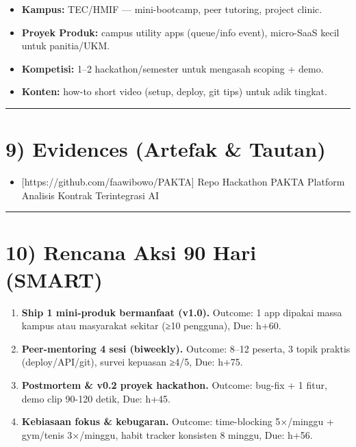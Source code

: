 \documentclass[
  letterpaper,
  DIV=11,
  numbers=noendperiod]{scrreprt}
\providecommand{\tightlist}{%
  \setlength{\itemsep}{0pt}\setlength{\parskip}{0pt}}
\begin{document}
\begin{itemize}
\tightlist
\item
  \textbf{Kampus:} TEC/HMIF --- mini-bootcamp, peer tutoring, project
  clinic.
\item
  \textbf{Proyek Produk:} campus utility apps (queue/info event),
  micro-SaaS kecil untuk panitia/UKM.
\item
  \textbf{Kompetisi:} 1--2 hackathon/semester untuk mengasah scoping +
  demo.
\item
  \textbf{Konten:} how-to short video (setup, deploy, git tips) untuk
  adik tingkat.
\end{itemize}

\begin{center}\rule{0.5\linewidth}{0.5pt}\end{center}

\section{9) Evidences (Artefak \&
Tautan)}\label{evidences-artefak-tautan}

\begin{itemize}
\tightlist
\item
  {[}https://github.com/faawibowo/PAKTA{]} Repo Hackathon PAKTA Platform
  Analisis Kontrak Terintegrasi AI
\end{itemize}

\begin{center}\rule{0.5\linewidth}{0.5pt}\end{center}

\section{10) Rencana Aksi 90 Hari
(SMART)}\label{rencana-aksi-90-hari-smart}

\begin{enumerate}
\def\labelenumi{\arabic{enumi}.}
\item
  \textbf{Ship 1 mini-produk bermanfaat (v1.0).} Outcome: 1 app dipakai
  massa kampus atau masyarakat sekitar (≥10 pengguna), Due: h+60.
\item
  \textbf{Peer-mentoring 4 sesi (biweekly).} Outcome: 8--12 peserta, 3
  topik praktis (deploy/API/git), survei kepuasan ≥4/5, Due: h+75.
\item
  \textbf{Postmortem \& v0.2 proyek hackathon.} Outcome: bug-fix + 1
  fitur, demo clip 90-120 detik, Due: h+45.
\item
  \textbf{Kebiasaan fokus \& kebugaran.} Outcome: time-blocking
  5×/minggu + gym/tenis 3×/minggu, habit tracker konsisten 8 minggu,
  Due: h+56.
\end{enumerate}
\end{document}
